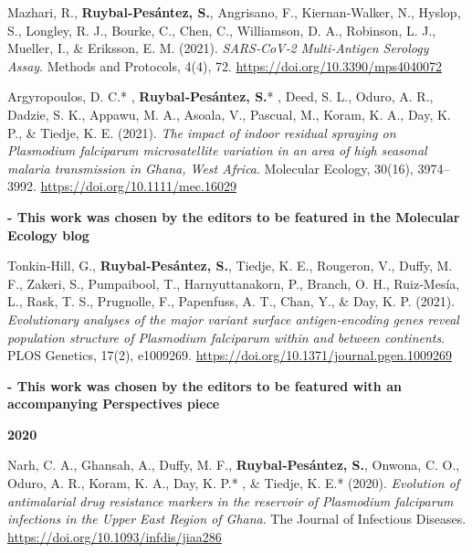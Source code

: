 \documentclass[11pt,a4paper,]{awesome-cv}
\begin{document}
Mazhari, R., \textbf{Ruybal‐Pesántez, S.}, Angrisano, F.,
Kiernan‐Walker, N., Hyslop, S., Longley, R. J., Bourke, C., Chen, C.,
Williamson, D. A., Robinson, L. J., Mueller, I., \& Eriksson, E. M.
(2021). \emph{SARS‐CoV‐2 Multi‐Antigen Serology Assay}. Methods and
Protocols, 4(4), 72. \url{https://doi.org/10.3390/mps4040072}

Argyropoulos, D. C.* , \textbf{Ruybal‐Pesántez, S.}* , Deed, S. L.,
Oduro, A. R., Dadzie, S. K., Appawu, M. A., Asoala, V., Pascual, M.,
Koram, K. A., Day, K. P., \& Tiedje, K. E. (2021). \emph{The impact of
indoor residual spraying on Plasmodium falciparum microsatellite
variation in an area of high seasonal malaria transmission in Ghana,
West Africa}. Molecular Ecology, 30(16), 3974--3992.
\url{https://doi.org/10.1111/mec.16029}

\setlength{\leftskip}{2cm}

\textbf{- This work was chosen by the editors to be featured in the
Molecular Ecology blog
\href{https://molecularecologyblog.com/2021/09/01/interview-with-the-authors-does-indoor-spraying-alter-the-genetic-diversity-of-malaria-causing-parasites-and-what-does-this-mean-for-long-term-control/}{\faExternalLink}}

\setlength{\leftskip}{1cm}

Tonkin‐Hill, G., \textbf{Ruybal‐Pesántez, S.}, Tiedje, K. E., Rougeron,
V., Duffy, M. F., Zakeri, S., Pumpaibool, T., Harnyuttanakorn, P.,
Branch, O. H., Ruiz‐Mesía, L., Rask, T. S., Prugnolle, F., Papenfuss, A.
T., Chan, Y., \& Day, K. P. (2021). \emph{Evolutionary analyses of the
major variant surface antigen‐encoding genes reveal population structure
of Plasmodium falciparum within and between continents}. PLOS Genetics,
17(2), e1009269. \url{https://doi.org/10.1371/journal.pgen.1009269}

\setlength{\leftskip}{2cm}

\textbf{- This work was chosen by the editors to be featured with an
accompanying Perspectives piece
\href{https://doi.org/10.1371/journal.pgen.1009344}{\faExternalLink}}

\setlength{\leftskip}{0cm}

\textbf{2020}

\setlength{\leftskip}{1cm}

Narh, C. A., Ghansah, A., Duffy, M. F., \textbf{Ruybal‐Pesántez, S.},
Onwona, C. O., Oduro, A. R., Koram, K. A., Day, K. P.* , \& Tiedje, K.
E.* (2020). \emph{Evolution of antimalarial drug resistance markers in
the reservoir of Plasmodium falciparum infections in the Upper East
Region of Ghana}. The Journal of Infectious Diseases.
\url{https://doi.org/10.1093/infdis/jiaa286}
\end{document}
